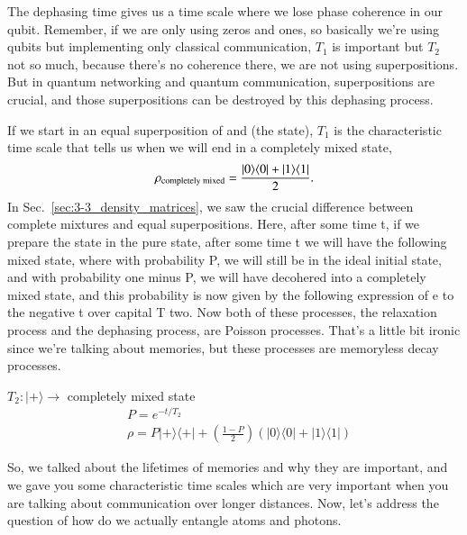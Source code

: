 \rdv{}
The dephasing time gives us a time scale where we lose phase coherence in our qubit. Remember, if we are only using zeros and ones, so basically we're using qubits but implementing only classical communication,  $T_1$ is important but  $T_2$ not so much, because there's no coherence there, we are not using superpositions. But in quantum networking and quantum communication, superpositions are crucial, and those superpositions can be destroyed by this dephasing process.

If we start in an equal superposition of  and  (the \ket{+} state), $T_1$ is the characteristic time scale that tells us when we will end in a completely mixed state,
\begin{equation}
\begin{aligned}
\rho_{\textrm{completely mixed}} =\frac{|0 \rangle \langle 0|+|1 \rangle \langle 1|}{2}.
\end{aligned}
\end{equation}
In Sec.~\ref{sec:3-3_density_matrices}, we saw the crucial difference between complete mixtures and equal superpositions. Here, after some time t, if we prepare the state in the pure state, after some time t we will have the following mixed state, where with probability P, we will still be in the ideal initial state, and with probability one minus P, we will have decohered into a completely mixed state, and this probability is now given by the following expression of e to the negative t over capital T two. Now both of these processes, the relaxation process and the dephasing process, are Poisson processes. That's a little bit ironic since we're talking about memories, but these processes are memoryless decay processes.

$T_2:|+\rangle \rightarrow$ completely mixed state
$$
\begin{aligned}
&P=e^{-t / T_2} \\
&\rho=P|+\rangle\langle+|+\left(\frac{1-P}{2}\right)(|0\rangle\langle 0|+| 1\rangle\langle 1|)
\end{aligned}
$$

So, we talked about the lifetimes of memories and why they are important, and we gave you some characteristic time scales which are very important when you are talking about communication over longer distances. Now, let's address the question of how do we actually entangle atoms and photons.

